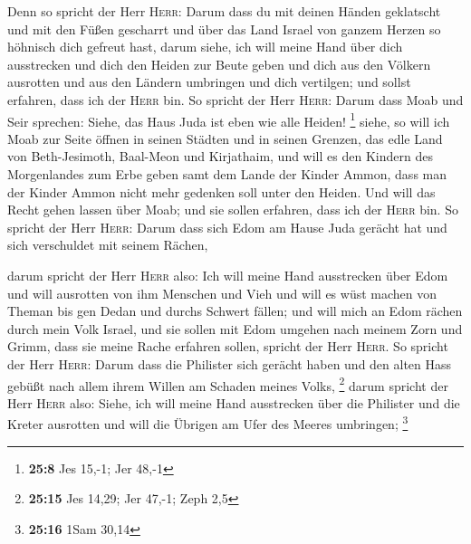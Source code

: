  Denn so spricht der Herr \textsc{Herr}: Darum dass du mit
deinen Händen geklatscht und mit den Füßen gescharrt und über das Land
Israel von ganzem Herzen so höhnisch dich gefreut hast, 
darum siehe, ich will meine Hand über dich ausstrecken und dich den
Heiden zur Beute geben und dich aus den Völkern ausrotten und aus den
Ländern umbringen und dich vertilgen; und sollst erfahren, dass ich der
\textsc{Herr} bin.  So spricht der Herr \textsc{Herr}:
Darum dass Moab und Seir sprechen: Siehe, das Haus Juda ist eben wie
alle Heiden! \footnote{\textbf{25:8} Jes 15,-1; Jer 48,-1}
 siehe, so will ich Moab zur Seite öffnen in seinen
Städten und in seinen Grenzen, das edle Land von Beth-Jesimoth,
Baal-Meon und Kirjathaim,  und will es den Kindern des
Morgenlandes zum Erbe geben samt dem Lande der Kinder Ammon, dass man
der Kinder Ammon nicht mehr gedenken soll unter den Heiden.
 Und will das Recht gehen lassen über Moab; und sie
sollen erfahren, dass ich der \textsc{Herr} bin.  So
spricht der Herr \textsc{Herr}: Darum dass sich Edom am Hause Juda
gerächt hat und sich verschuldet mit seinem Rächen,

 darum spricht der Herr \textsc{Herr} also: Ich will
meine Hand ausstrecken über Edom und will ausrotten von ihm Menschen und
Vieh und will es wüst machen von Theman bis gen Dedan und durchs Schwert
fällen;  und will mich an Edom rächen durch mein Volk
Israel, und sie sollen mit Edom umgehen nach meinem Zorn und Grimm, dass
sie meine Rache erfahren sollen, spricht der Herr \textsc{Herr}.
 So spricht der Herr \textsc{Herr}: Darum dass die
Philister sich gerächt haben und den alten Hass gebüßt nach allem ihrem
Willen am Schaden meines Volks, \footnote{\textbf{25:15} Jes 14,29; Jer
  47,-1; Zeph 2,5}  darum spricht der Herr \textsc{Herr}
also: Siehe, ich will meine Hand ausstrecken über die Philister und die
Kreter ausrotten und will die Übrigen am Ufer des Meeres umbringen;
\footnote{\textbf{25:16} 1Sam 30,14}

